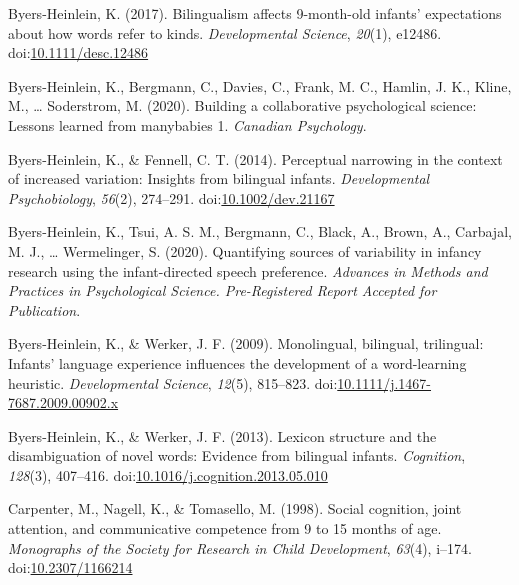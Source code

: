\documentclass[,man,floatsintext]{apa6}
\begin{document}
\leavevmode\hypertarget{ref-Byers-Heinlein_2017}{}%
Byers-Heinlein, K. (2017). Bilingualism affects 9-month-old infants' expectations about how words refer to kinds. \emph{Developmental Science}, \emph{20}(1), e12486. doi:\href{https://doi.org/10.1111/desc.12486}{10.1111/desc.12486}

\leavevmode\hypertarget{ref-Byers-Heinlein_etal_2020a}{}%
Byers-Heinlein, K., Bergmann, C., Davies, C., Frank, M. C., Hamlin, J. K., Kline, M., \ldots{} Soderstrom, M. (2020). Building a collaborative psychological science: Lessons learned from manybabies 1. \emph{Canadian Psychology}.

\leavevmode\hypertarget{ref-Byers-Heinlein_Fennell_2014}{}%
Byers-Heinlein, K., \& Fennell, C. T. (2014). Perceptual narrowing in the context of increased variation: Insights from bilingual infants. \emph{Developmental Psychobiology}, \emph{56}(2), 274--291. doi:\href{https://doi.org/10.1002/dev.21167}{10.1002/dev.21167}

\leavevmode\hypertarget{ref-Byers-Heinlein_etal_2020b}{}%
Byers-Heinlein, K., Tsui, A. S. M., Bergmann, C., Black, A., Brown, A., Carbajal, M. J., \ldots{} Wermelinger, S. (2020). Quantifying sources of variability in infancy research using the infant-directed speech preference. \emph{Advances in Methods and Practices in Psychological Science. Pre-Registered Report Accepted for Publication}.

\leavevmode\hypertarget{ref-Byers-Heinlein_Werker_2009}{}%
Byers-Heinlein, K., \& Werker, J. F. (2009). Monolingual, bilingual, trilingual: Infants' language experience influences the development of a word-learning heuristic. \emph{Developmental Science}, \emph{12}(5), 815--823. doi:\href{https://doi.org/10.1111/j.1467-7687.2009.00902.x}{10.1111/j.1467-7687.2009.00902.x}

\leavevmode\hypertarget{ref-Byers-Heinlein_Werker_2013}{}%
Byers-Heinlein, K., \& Werker, J. F. (2013). Lexicon structure and the disambiguation of novel words: Evidence from bilingual infants. \emph{Cognition}, \emph{128}(3), 407--416. doi:\href{https://doi.org/10.1016/j.cognition.2013.05.010}{10.1016/j.cognition.2013.05.010}

\leavevmode\hypertarget{ref-Carpenter_etal_1998}{}%
Carpenter, M., Nagell, K., \& Tomasello, M. (1998). Social cognition, joint attention, and communicative competence from 9 to 15 months of age. \emph{Monographs of the Society for Research in Child Development}, \emph{63}(4), i--174. doi:\href{https://doi.org/10.2307/1166214}{10.2307/1166214}
\end{document}
